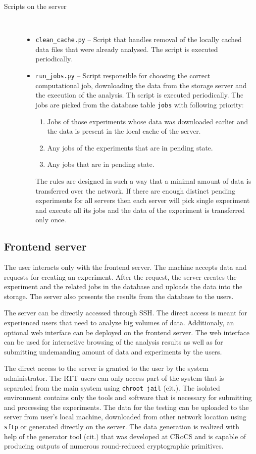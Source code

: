 \documentclass[
  digital,  	%
  color,		%
  oneside,   	%
  12pt,
  nocover,
  notable,
  nolof,
  nolot,
]{fithesis3}
\newenvironment{titlemize}[1]
{
	\begin{description}
	\item[#1]\
	\begin{itemize}
}
{
	\end{itemize}
 	\end{description}
}
\theoremstyle{definition}
\theoremstyle{remark}
\begin{document}
\begin{titlemize}{Scripts on the server}
\item \texttt{clean\_cache.py} -- Script that handles removal of the locally cached data files that were already analysed. The script is executed periodically.
\item \texttt{run\_jobs.py} -- Script responsible for choosing the correct computational job, downloading the data from the storage server and the execution of the analysis. Th script is executed periodically. The jobs are picked from the database table \texttt{jobs} with following priority:
\begin{enumerate}
\item Jobs of those experiments whose data was downloaded earlier and the data is present in the local cache of the server.
\item Any jobs of the experiments that are in pending state.
\item Any jobs that are in pending state.
\end{enumerate}
The rules are designed in such a way that a minimal amount of data is transferred over the network. If there are enough distinct pending experiments for all servers then each server will pick single experiment and execute all its jobs and the data of the experiment is transferred only once.
\end{titlemize}

\subsection{Frontend server}
The user interacts only with the frontend server. The machine accepts data and requests for creating an experiment. After the request, the server creates the experiment and the related jobs in the database and uploads the data into the storage. The server also presents the results from the database to the users.

The server can be directly accessed through SSH. The direct access is meant for experienced users that need to analyze big volumes of data. Additionaly, an optional web interface can be deployed on the frontend server. The web interface can be used for interactive browsing of the analysis results as well as for submitting undemanding amount of data and experiments by the users.

The direct access to the server is granted to the user by the system administrator. The RTT users can only access part of the system that is separated from the main system using \texttt{chroot jail} (cit.). The isolated environment contains only the tools and software that is necessary for submitting and processing the experiments. The data for the testing can be uploaded to the server from user's local machine, downloaded from other network location using \texttt{sftp} or generated directly on the server. The data generation is realized with help of the generator tool (cit.) that was developed at CRoCS and is capable of producing outputs of numerous round-reduced cryptographic primitives.
\end{document}
